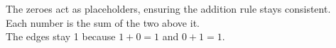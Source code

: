 \documentclass[preview]{standalone}
\begin{document}
\begin{center}
The zeroes act as placeholders, ensuring the addition rule stays consistent.\\ Each number is the sum of the two above it.\\ The edges stay 1 because $1 + 0 = 1$ and $0 + 1 = 1$.
\end{center}
\end{document}
